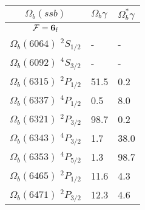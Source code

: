 \begin{tabular}{c |  p{0.65cm}  p{0.65cm}} \hline \hline
$\Omega_b(ssb)$  & $\Omega_{b} \gamma$  & $\Omega^{*}_{b} \gamma$  \\ \hline
$\mathcal{F}={\bf {6}}_{\rm f}$ &&\\ \hline
$\Omega_b(6064)$ $^{2}S_{1/2}$&-  &- \\
$\Omega_b(6092)$ $^{4}S_{3/2}$&-  &- \\
$\Omega_b(6315)$ $^{2}P_{1/2}$&51.5  &0.2 \\
$\Omega_b(6337)$ $^{4}P_{1/2}$&0.5  &8.0 \\
$\Omega_b(6321)$ $^{2}P_{3/2}$&98.7  &0.2 \\
$\Omega_b(6343)$ $^{4}P_{3/2}$&1.7  &38.0 \\
$\Omega_b(6353)$ $^{4}P_{5/2}$&1.3  &98.7 \\
$\Omega_b(6465)$ $^{2}P_{1/2}$&11.6  &4.3 \\
$\Omega_b(6471)$ $^{2}P_{3/2}$&12.3  &4.6 \\
\hline \hline
\end{tabular}
